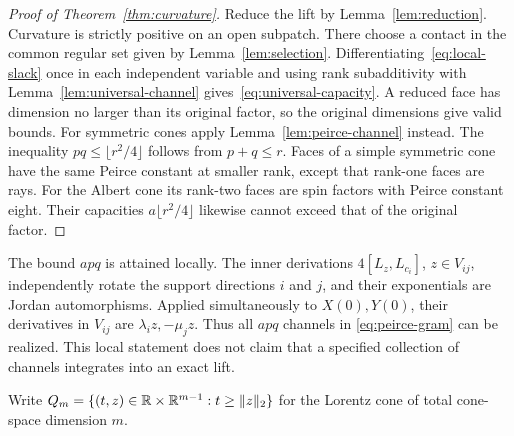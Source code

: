 \begin{proof}[Proof of Theorem~\ref{thm:curvature}]
Reduce the lift by Lemma~\ref{lem:reduction}. Curvature is strictly
positive on an open subpatch. There choose a contact in
the common regular set given by Lemma~\ref{lem:selection}. Differentiating~\eqref{eq:local-slack} once
in each independent variable and using rank subadditivity with
Lemma~\ref{lem:universal-channel} gives~\eqref{eq:universal-capacity}.
A reduced face has dimension no larger than its original factor, so the
original dimensions give valid bounds. For symmetric cones apply
Lemma~\ref{lem:peirce-channel} instead. The inequality
$pq\leq\lfloor r^2/4\rfloor$ follows from $p+q\leq r$.
Faces of a simple symmetric cone have the same Peirce constant at smaller
rank, except that rank-one faces are rays. For the Albert cone its
rank-two faces are spin factors with Peirce constant eight. Their
capacities $a\lfloor r^2/4\rfloor$ likewise cannot exceed that of the
original factor.
\end{proof}

The bound $apq$ is attained locally. The inner derivations
$4[L_z,L_{c_i}]$, $z\in V_{ij}$, independently rotate the support
directions $i$ and $j$, and their exponentials are Jordan automorphisms.
Applied simultaneously to $X(0),Y(0)$, their derivatives in $V_{ij}$ are
$\lambda_i z,-\mu_jz$. Thus all $apq$ channels in \eqref{eq:peirce-gram}
can be realized. This local statement does not claim that a specified
collection of channels integrates into an exact lift.

Write $Q_m=\{(t,z)\in\mathbb R\times\mathbb R^{m-1}:t\geq\lVert z\rVert_2\}$ for
the Lorentz cone of total cone-space dimension $m$.

